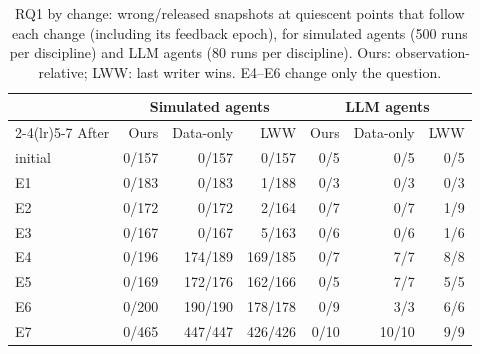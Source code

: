 \documentclass[pdflatex,sn-mathphys-num]{sn-jnl}
\theoremstyle{thmstyleone}%
\theoremstyle{thmstyletwo}%
\theoremstyle{thmstylethree}%
\newcommand{\SimRuns}{500}
\newcommand{\LlmReps}{80}
\begin{document}
\begin{table}[!ht]
\caption{RQ1 by change: wrong/released snapshots at quiescent points that follow each change (including its feedback epoch), for simulated agents (\SimRuns{} runs per discipline) and LLM agents (\LlmReps{} runs per discipline). Ours: observation-relative; LWW: last writer wins. E4--E6 change only the question.}\label{tab:perchange}
\footnotesize\setlength{\tabcolsep}{4pt}
\begin{tabular}{@{}lrrrrrr@{}}\toprule
 & \multicolumn{3}{c}{Simulated agents} & \multicolumn{3}{c}{LLM agents}\\\cmidrule(lr){2-4}\cmidrule(lr){5-7}
After & Ours & Data-only & LWW & Ours & Data-only & LWW\\\midrule
initial & 0/157 & 0/157 & 0/157 & 0/5 & 0/5 & 0/5 \\
E1 & 0/183 & 0/183 & 1/188 & 0/3 & 0/3 & 0/3 \\
E2 & 0/172 & 0/172 & 2/164 & 0/7 & 0/7 & 1/9 \\
E3 & 0/167 & 0/167 & 5/163 & 0/6 & 0/6 & 1/6 \\
E4 & 0/196 & 174/189 & 169/185 & 0/7 & 7/7 & 8/8 \\
E5 & 0/169 & 172/176 & 162/166 & 0/5 & 7/7 & 5/5 \\
E6 & 0/200 & 190/190 & 178/178 & 0/9 & 3/3 & 6/6 \\
E7 & 0/465 & 447/447 & 426/426 & 0/10 & 10/10 & 9/9 \\
\bottomrule
\end{tabular}
\end{table}
\end{document}
